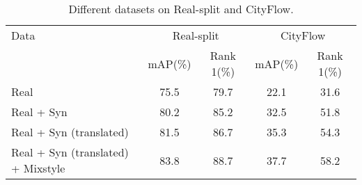 \begin{table}[]
	\centering
	\begin{tabular}{l|cc|cc}
		\hline
		Data & \multicolumn{2}{c}{Real-split} & \multicolumn{2}{c}{CityFlow}\\
		& mAP(\%) & Rank 1(\%) & mAP(\%) & Rank 1(\%)\\
		\hline\hline
		Real & 75.5 & 79.7 & 22.1 & 31.6\\
		\hline
		Real + Syn & 80.2 & 85.2 & 32.5 & 51.8\\
		\hline
		Real + Syn (translated) & 81.5 & 86.7 & 35.3 & 54.3\\
		\hline
		Real + Syn (translated) + Mixstyle & 83.8 & 88.7 & 37.7 & 58.2\\
		\hline
	\end{tabular}
	\caption{Different datasets on Real-split and CityFlow.}
	\label{tab:dataset}
\end{table}